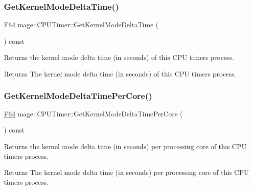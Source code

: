 \subsubsection{\texorpdfstring{Get\+Kernel\+Mode\+Delta\+Time()}{GetKernelModeDeltaTime()}}
{\footnotesize\ttfamily \hyperlink{namespacemage_ad26233bbec640deda836e572c1a23708}{F64} mage\+::\+C\+P\+U\+Timer\+::\+Get\+Kernel\+Mode\+Delta\+Time (\begin{DoxyParamCaption}{ }\end{DoxyParamCaption}) const\hspace{0.3cm}{\ttfamily [noexcept]}}

Returns the kernel mode delta time (in seconds) of this C\+PU timer\textquotesingle{}s process.

\begin{DoxyReturn}{Returns}
The kernel mode delta time (in seconds) of this C\+PU timer\textquotesingle{}s process. 
\end{DoxyReturn}
\hypertarget{classmage_1_1_c_p_u_timer_a7c503d9d66548e74ea29d887ee1ddcd3}{}\label{classmage_1_1_c_p_u_timer_a7c503d9d66548e74ea29d887ee1ddcd3} 
\subsubsection{\texorpdfstring{Get\+Kernel\+Mode\+Delta\+Time\+Per\+Core()}{GetKernelModeDeltaTimePerCore()}}
{\footnotesize\ttfamily \hyperlink{namespacemage_ad26233bbec640deda836e572c1a23708}{F64} mage\+::\+C\+P\+U\+Timer\+::\+Get\+Kernel\+Mode\+Delta\+Time\+Per\+Core (\begin{DoxyParamCaption}{ }\end{DoxyParamCaption}) const\hspace{0.3cm}{\ttfamily [noexcept]}}

Returns the kernel mode delta time (in seconds) per processing core of this C\+PU timer\textquotesingle{}s process.

\begin{DoxyReturn}{Returns}
The kernel mode delta time (in seconds) per processing core of this C\+PU timer\textquotesingle{}s process. 
\end{DoxyReturn}
\hypertarget{classmage_1_1_c_p_u_timer_ae13da8e25167ec92802d272901e2598c}{}\label{classmage_1_1_c_p_u_timer_ae13da8e25167ec92802d272901e2598c} 
